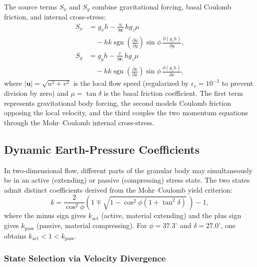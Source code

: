 \documentclass[10pt, conference]{FMFP2023}
\begin{document}
The source terms $S_x$ and $S_y$ combine gravitational forcing, basal
Coulomb friction, and internal cross-stress:
\begin{equation}
\begin{aligned}
    S_x &= g_xh - \frac{u}{|\bm{u}|}\,hg_z\mu \\
        &\quad - hk\operatorname{sgn}\!\left(\frac{\partial u}
          {\partial y}\right)\sin\phi\,
          \frac{\partial(g_zh)}{\partial y},
\end{aligned}
    \label{eq:source_x}
\end{equation}
\begin{equation}
\begin{aligned}
    S_y &= g_yh - \frac{v}{|\bm{u}|}\,hg_z\mu \\
        &\quad - hk\operatorname{sgn}\!\left(\frac{\partial v}
          {\partial x}\right)\sin\phi\,
          \frac{\partial(g_zh)}{\partial x},
\end{aligned}
    \label{eq:source_y}
\end{equation}
where $|\bm{u}|=\sqrt{u^2+v^2}$ is the local flow speed (regularized
by $\epsilon_r=10^{-3}$ to prevent division by zero) and
$\mu=\tan\delta$ is the basal friction coefficient.
The first term represents gravitational body forcing, the second models
Coulomb friction opposing the local velocity, and the third couples
the two momentum equations through the Mohr--Coulomb internal
cross-stress.

\subsection{Dynamic Earth-Pressure Coefficients}

In two-dimensional flow, different parts of the granular body may
simultaneously be in an active (extending) or passive (compressing)
stress state.
The two states admit distinct coefficients derived from the
Mohr--Coulomb yield criterion:
\begin{equation}
    k = \frac{2}{\cos^2\phi}
        \left(1 \mp \sqrt{1 - \cos^2\phi\left(1+\tan^2\delta\right)}
        \,\right) - 1,
    \label{eq:k_active_passive}
\end{equation}
where the minus sign gives $k_{\text{act}}$ (active, material
extending) and the plus sign gives $k_{\text{pass}}$ (passive,
material compressing).
For $\phi=37.3^\circ$ and $\delta=27.0^\circ$, one obtains
$k_{\text{act}}<1<k_{\text{pass}}$.

\subsubsection{State Selection via Velocity Divergence}
\end{document}
